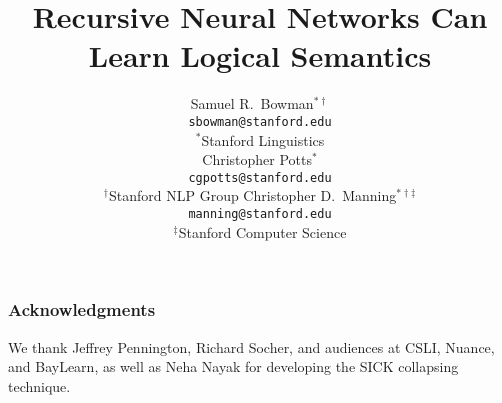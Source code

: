 \documentclass[11pt]{article}
\title{Recursive Neural Networks Can Learn Logical Semantics}
\author{
Samuel R.\ Bowman$^{\ast\dag}$ \\
\texttt{sbowman@stanford.edu} \\[2ex]
$^{\ast}$Stanford Linguistics \\
\And
Christopher Potts$^{\ast}$\\
\texttt{cgpotts@stanford.edu} \\[2ex]
$^{\dag}$Stanford NLP Group
\And
Christopher D.\ Manning$^{\ast\dag\ddag}$\\
\texttt{manning@stanford.edu}\\[2ex]
$^{\ddag}$Stanford Computer Science
}
\date{}
\begin{document}
\maketitle










\subsubsection*{Acknowledgments}

We thank Jeffrey Pennington, Richard Socher, and audiences at CSLI, Nuance, and BayLearn, as well as Neha Nayak for developing the SICK collapsing technique.


%
%
%
%
%
\end{document}
